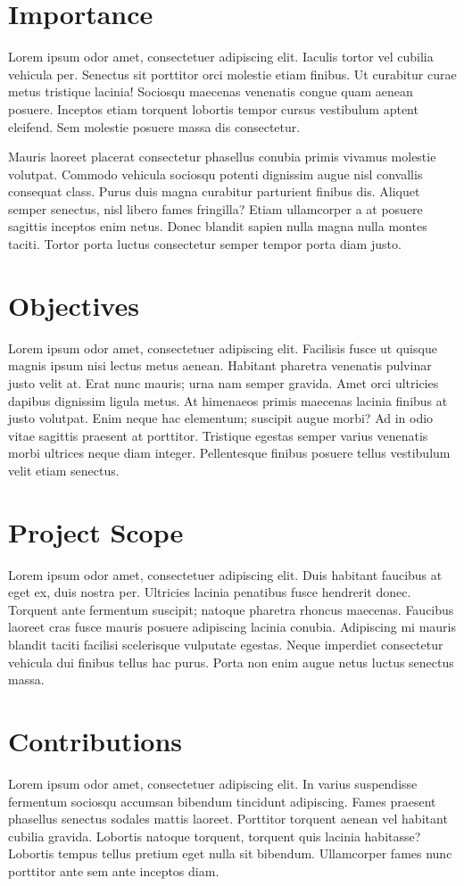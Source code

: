 \section{Importance}
Lorem ipsum odor amet, consectetuer adipiscing elit. Iaculis tortor vel cubilia vehicula per. Senectus sit porttitor orci molestie etiam finibus. Ut curabitur curae metus tristique lacinia! Sociosqu maecenas venenatis congue quam aenean posuere. Inceptos etiam torquent lobortis tempor cursus vestibulum aptent eleifend. Sem molestie posuere massa dis consectetur.

Mauris laoreet placerat consectetur phasellus conubia primis vivamus molestie volutpat. Commodo vehicula sociosqu potenti dignissim augue nisl convallis consequat class. Purus duis magna curabitur parturient finibus dis. Aliquet semper senectus, nisl libero fames fringilla? Etiam ullamcorper a at posuere sagittis inceptos enim netus. Donec blandit sapien nulla magna nulla montes taciti. Tortor porta luctus consectetur semper tempor porta diam justo.

\section{Objectives}
Lorem ipsum odor amet, consectetuer adipiscing elit. Facilisis fusce ut quisque magnis ipsum nisi lectus metus aenean. Habitant pharetra venenatis pulvinar justo velit at. Erat nunc mauris; urna nam semper gravida. Amet orci ultricies dapibus dignissim ligula metus. At himenaeos primis maecenas lacinia finibus at justo volutpat. Enim neque hac elementum; suscipit augue morbi? Ad in odio vitae sagittis praesent at porttitor. Tristique egestas semper varius venenatis morbi ultrices neque diam integer. Pellentesque finibus posuere tellus vestibulum velit etiam senectus.

\section{Project Scope}
Lorem ipsum odor amet, consectetuer adipiscing elit. Duis habitant faucibus at eget ex, duis nostra per. Ultricies lacinia penatibus fusce hendrerit donec. Torquent ante fermentum suscipit; natoque pharetra rhoncus maecenas. Faucibus laoreet cras fusce mauris posuere adipiscing lacinia conubia. Adipiscing mi mauris blandit taciti facilisi scelerisque vulputate egestas. Neque imperdiet consectetur vehicula dui finibus tellus hac purus. Porta non enim augue netus luctus senectus massa.

\section{Contributions}
Lorem ipsum odor amet, consectetuer adipiscing elit. In varius suspendisse fermentum sociosqu accumsan bibendum tincidunt adipiscing. Fames praesent phasellus senectus sodales mattis laoreet. Porttitor torquent aenean vel habitant cubilia gravida. Lobortis natoque torquent, torquent quis lacinia habitasse? Lobortis tempus tellus pretium eget nulla sit bibendum. Ullamcorper fames nunc porttitor ante sem ante inceptos diam.

